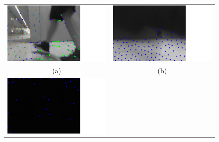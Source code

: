 \documentclass[conference]{IEEEtran}
\begin{document}
		\begin{figure}
		\begin{center}
			\begin{tabular}{cc}
				\includegraphics[scale=0.11]{fig/feet.pdf} &
				\includegraphics[scale=0.11]{fig/hand.pdf} \\
				(a) & (b) \\
				\includegraphics[scale=0.11]{fig/dark.pdf}&

\end{tabular}
\end{center}
\end{figure}
\end{document}

